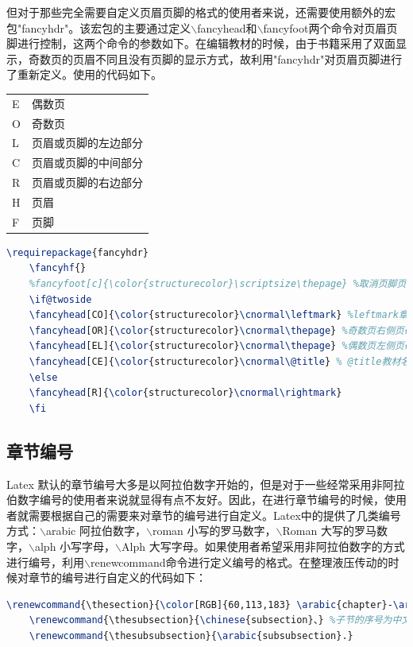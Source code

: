 \documentclass[12pt]{book}
\begin{document}
但对于那些完全需要自定义页眉页脚的格式的使用者来说，还需要使用额外的宏包"fancyhdr"。该宏包的主要通过定义$\backslash$fancyhead和$\backslash$fancyfoot两个命令对页眉页脚进行控制，这两个命令的参数如下。在编辑教材的时候，由于书籍采用了双面显示，奇数页的页眉不同且没有页脚的显示方式，故利用"fancyhdr"对页眉页脚进行了重新定义。使用的代码如下。
\begin{table}[h]
	\centering
	\begin{tabular}{ll}
		E &	偶数页\\
		O &	奇数页 \\
		L &	页眉或页脚的左边部分\\
		C &	页眉或页脚的中间部分\\
		R &	页眉或页脚的右边部分\\
		H &	页眉\\
		F &	页脚
	\end{tabular}
\end{table}
\begin{lstlisting}[language=tex,breaklines]
	\requirepackage{fancyhdr}
	\fancyhf{} 
	%fancyfoot[c]{\color{structurecolor}\scriptsize\thepage} %取消页脚页码
	\if@twoside
	\fancyhead[CO]{\color{structurecolor}\cnormal\leftmark} %leftmark章节名称，奇数页页眉中部显示章节名称
	\fancyhead[OR]{\color{structurecolor}\cnormal\thepage} %奇数页右侧页码
	\fancyhead[EL]{\color{structurecolor}\cnormal\thepage} %偶数页左侧页码
	\fancyhead[CE]{\color{structurecolor}\cnormal\@title} % @title教材名称，偶数页页眉中部显示教材名称
	\else
	\fancyhead[R]{\color{structurecolor}\cnormal\rightmark}
	\fi
\end{lstlisting}

\subsection{章节编号}

Latex 默认的章节编号大多是以阿拉伯数字开始的，但是对于一些经常采用非阿拉伯数字编号的使用者来说就显得有点不友好。因此，在进行章节编号的时候，使用者就需要根据自己的需要来对章节的编号进行自定义。Latex中的提供了几类编号方式：$\backslash$arabic 阿拉伯数字，$\backslash$roman 小写的罗马数字，$\backslash$Roman 大写的罗马数字，$\backslash$alph 小写字母，$\backslash$Alph 大写字母。如果使用者希望采用非阿拉伯数字的方式进行编号，利用$\backslash$renewcommand命令进行定义编号的格式。在整理液压传动的时候对章节的编号进行自定义的代码如下：

\begin{lstlisting}[language=tex,breaklines]
	\renewcommand{\thesection}{\color[RGB]{60,113,183} \arabic{chapter}-\arabic{section}} %设置section的格式为章序号-节序号
	\renewcommand{\thesubsection}{\chinese{subsection}、} %子节的序号为中文序号+顿号
	\renewcommand{\thesubsubsection}{\arabic{subsubsection}.} 
\end{lstlisting}
\end{document}
